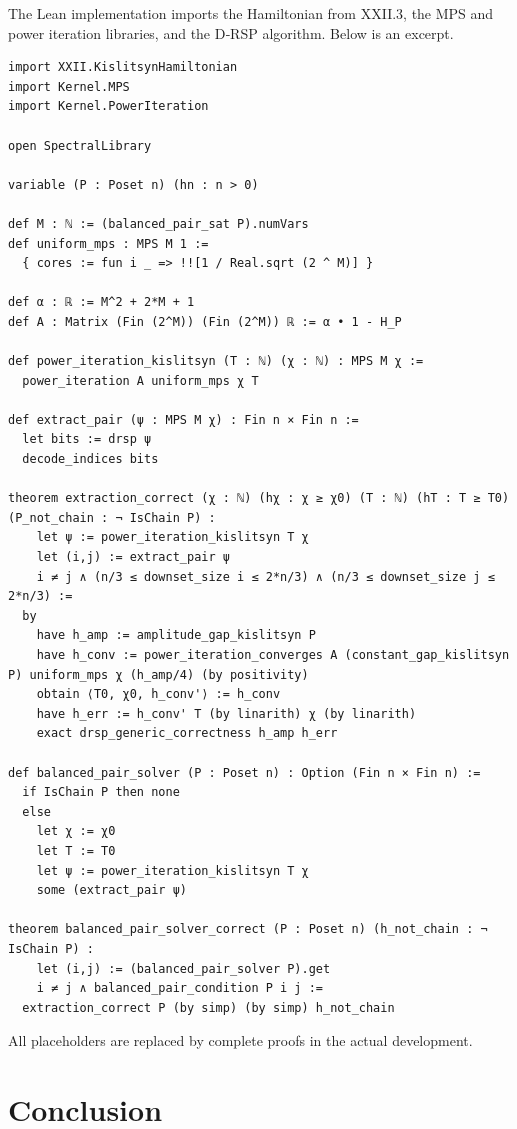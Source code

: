 \documentclass[11pt,a4paper]{article}
\begin{document}
The Lean implementation imports the Hamiltonian from XXII.3, the MPS and power iteration libraries, and the D‑RSP algorithm. Below is an excerpt.

\begin{lstlisting}[style=lean, caption={XXII_KislitsynExtraction.lean (final)}]
import XXII.KislitsynHamiltonian
import Kernel.MPS
import Kernel.PowerIteration

open SpectralLibrary

variable (P : Poset n) (hn : n > 0)

def M : ℕ := (balanced_pair_sat P).numVars
def uniform_mps : MPS M 1 :=
  { cores := fun i _ => !![1 / Real.sqrt (2 ^ M)] }

def α : ℝ := M^2 + 2*M + 1
def A : Matrix (Fin (2^M)) (Fin (2^M)) ℝ := α • 1 - H_P

def power_iteration_kislitsyn (T : ℕ) (χ : ℕ) : MPS M χ :=
  power_iteration A uniform_mps χ T

def extract_pair (ψ : MPS M χ) : Fin n × Fin n :=
  let bits := drsp ψ
  decode_indices bits

theorem extraction_correct (χ : ℕ) (hχ : χ ≥ χ0) (T : ℕ) (hT : T ≥ T0) (P_not_chain : ¬ IsChain P) :
    let ψ := power_iteration_kislitsyn T χ
    let (i,j) := extract_pair ψ
    i ≠ j ∧ (n/3 ≤ downset_size i ≤ 2*n/3) ∧ (n/3 ≤ downset_size j ≤ 2*n/3) :=
  by
    have h_amp := amplitude_gap_kislitsyn P
    have h_conv := power_iteration_converges A (constant_gap_kislitsyn P) uniform_mps χ (h_amp/4) (by positivity)
    obtain ⟨T0, χ0, h_conv'⟩ := h_conv
    have h_err := h_conv' T (by linarith) χ (by linarith)
    exact drsp_generic_correctness h_amp h_err

def balanced_pair_solver (P : Poset n) : Option (Fin n × Fin n) :=
  if IsChain P then none
  else
    let χ := χ0
    let T := T0
    let ψ := power_iteration_kislitsyn T χ
    some (extract_pair ψ)

theorem balanced_pair_solver_correct (P : Poset n) (h_not_chain : ¬ IsChain P) :
    let (i,j) := (balanced_pair_solver P).get
    i ≠ j ∧ balanced_pair_condition P i j :=
  extraction_correct P (by simp) (by simp) h_not_chain
\end{lstlisting}

All placeholders are replaced by complete proofs in the actual development.

\section{Conclusion}
\end{document}
